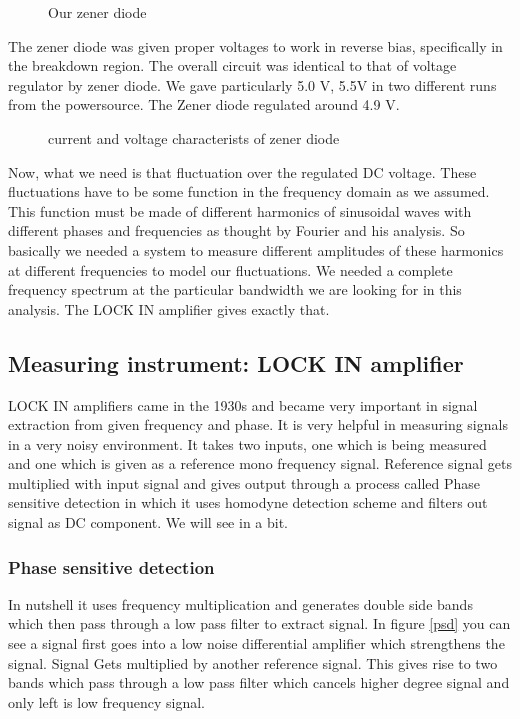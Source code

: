 \documentclass[12pt]{article}
\begin{document}
\begin{figure}[hbt!]
\caption{Our zener diode}
\end{figure}

The zener diode was given proper voltages to work in reverse bias, specifically in the breakdown region. The overall circuit was identical to that of voltage regulator by zener diode. We gave particularly 5.0 V, 5.5V in two different runs from the powersource. The Zener diode regulated around 4.9 V. 

\begin{figure}[hbt!]
\caption{current and voltage characterists of zener diode \label{exiv}}
\end{figure}

Now, what we need is that fluctuation over the regulated DC voltage. These fluctuations have to be some function in the frequency domain as we assumed. This function must be made of different harmonics of sinusoidal waves with different phases and frequencies as thought by Fourier and his analysis. So basically we needed a system to measure different amplitudes of these harmonics at different frequencies to model our fluctuations. We needed a complete frequency spectrum at the particular bandwidth we are looking for in this analysis. The LOCK IN amplifier gives exactly that. 


\subsection{Measuring instrument: LOCK IN amplifier}

LOCK IN amplifiers came in the 1930s and became very important in signal extraction from given frequency and phase. It is very helpful in measuring signals in a very noisy environment. It takes two inputs, one which is being measured and one which is given as a reference mono frequency signal. Reference signal gets multiplied with input signal and gives output through a process called Phase sensitive detection in which it uses homodyne detection scheme and filters out signal as DC component. We will see in a bit.

\subsubsection{Phase sensitive detection}

In nutshell it uses frequency multiplication and generates double side bands which then pass through a low pass filter to extract signal. In figure \ref{psd} you can see a signal first goes into a low noise differential amplifier which strengthens the signal. Signal Gets multiplied by another reference signal. This gives rise to two bands which pass through a low pass filter which cancels higher degree signal and only left is low frequency signal.
\end{document}
